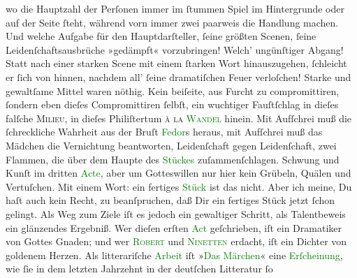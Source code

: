                wo  die Haupt\strikeout{\textcolor{gray}{h}}zahl der Perſonen immer im ſtummen Spiel im Hintergrunde oder auf der Seite
               ſteht, während vorn immer zwei paarweis {\pb}die
               Handlung machen. Und welche Aufgabe für den Hauptdarſteller, ſeine größten Scenen,
               ſeine Leidenſchaftsausbrüche »gedämpft« vorzubringen! Welch’ ungünſtiger Abgang!
               Statt nach einer starken Scene mit einem ſtarken Wort hinauszugehen, ſchleicht er
               ſich von hinnen, nachdem all’ ſeine dramatiſchen Feuer verloſchen! Starke und
               gewaltſame Mittel waren nöthig. Kein beiſeite, aus Furcht zu compromittiren, ſondern
               eben dieſes Compromittiren ſelbſt, ein wuchtiger Fauſtſchlag \strikeout{\textcolor{gray}{×}\-\textcolor{gray}{×}\-\textcolor{gray}{×}} in dieſes falſche \textsc{Milieu}, in dieſes Philiſtertum \textsc{à la \textcolor{green}{Wandel}{}} hinein. Mit Aufſchrei muß die ſchreckliche Wahrheit aus der Bruſt \textcolor{green}{Fedor}{}s heraus, mit Aufſchrei
               muß das Mädchen die Vernichtung beantworten, Leidenſchaft gegen Leidenſchaft, zwei
               Flammen, die über dem Haupte des \textcolor{green}{Stückes}{} zuſammenſchlagen. Schwung und Kunſt im dritten \textcolor{green}{Acte}{}, aber {\pb}um Gotteswillen nur hier kein Grübeln, Quälen und Vertuſchen.\pend
           \pstart
           Mit einem Wort: ein fertiges \textcolor{green}{Stück}{} ist das nicht. Aber ich meine, Du haſt auch kein Recht, zu
               beanſpruchen, daß Dir ein fertiges Stück jetzt ſchon gelingt. Als Weg zum Ziele iſt
               es jedoch ein gewaltiger Schritt, als Talentbeweis ein glänzendes Ergebniß. Wer
               dieſen erſten \textcolor{green}{Act}{} geſchrieben,
               iſt ein Dramatiker von Gottes Gnaden; und wer \textsc{\textcolor{green}{Robert}{}} und \textsc{\textcolor{green}{Ninetten}{}} erdacht, iſt ein Dichter von goldenem Herzen. Als litterariſche \textcolor{green}{Arbeit}{} iſt »\textcolor{green}{Das Märchen}{}\ledrightnote{\textcolor{green}{Das Märchen. Schauspiel in drei Aufzügen}}« eine \textcolor{green}{Erſcheinung}{}, wie ſie in dem letzten Jahrzehnt in der deutſchen Litteratur ſo
